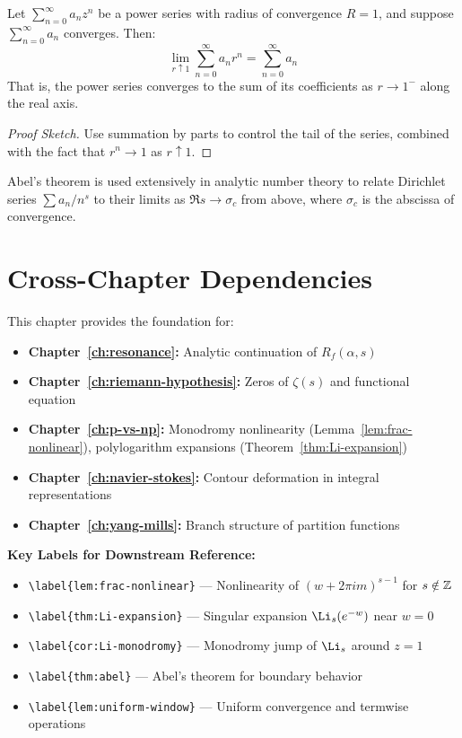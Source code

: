 \begin{theorem}\label{thm:abel}
Let $\sum_{n=0}^{\infty} a_n z^n$ be a power series with radius of convergence $R = 1$, and suppose $\sum_{n=0}^{\infty} a_n$ converges. Then:
\begin{equation}
\lim_{r \uparrow 1} \sum_{n=0}^{\infty} a_n r^n = \sum_{n=0}^{\infty} a_n
\end{equation}
That is, the power series converges to the sum of its coefficients as $r \to 1^-$ along the real axis.
\end{theorem}

\begin{proof}[Proof Sketch]
Use summation by parts to control the tail of the series, combined with the fact that $r^n \to 1$ as $r \uparrow 1$.
\end{proof}

\begin{remark}
Abel's theorem is used extensively in analytic number theory to relate Dirichlet series $\sum a_n / n^s$ to their limits as $\Re s \to \sigma_c$ from above, where $\sigma_c$ is the abscissa of convergence.
\end{remark}

\section{Cross-Chapter Dependencies}
\label{sec:dependencies}

This chapter provides the foundation for:

\begin{itemize}
\item \textbf{Chapter~\ref{ch:resonance}:} Analytic continuation of $R_f(\alpha, s)$
\item \textbf{Chapter~\ref{ch:riemann-hypothesis}:} Zeros of $\zeta(s)$ and functional equation
\item \textbf{Chapter~\ref{ch:p-vs-np}:} Monodromy nonlinearity (Lemma~\ref{lem:frac-nonlinear}), polylogarithm expansions (Theorem~\ref{thm:Li-expansion})
\item \textbf{Chapter~\ref{ch:navier-stokes}:} Contour deformation in integral representations
\item \textbf{Chapter~\ref{ch:yang-mills}:} Branch structure of partition functions
\end{itemize}

\textbf{Key Labels for Downstream Reference:}
\begin{itemize}
\item \verb|\label{lem:frac-nonlinear}| — Nonlinearity of $(w + 2\pi i m)^{s-1}$ for $s \notin \mathbb{Z}$
\item \verb|\label{thm:Li-expansion}| — Singular expansion $\Li_s(e^{-w})$ near $w = 0$
\item \verb|\label{cor:Li-monodromy}| — Monodromy jump of $\Li_s$ around $z = 1$
\item \verb|\label{thm:abel}| — Abel's theorem for boundary behavior
\item \verb|\label{lem:uniform-window}| — Uniform convergence and termwise operations
\end{itemize}

